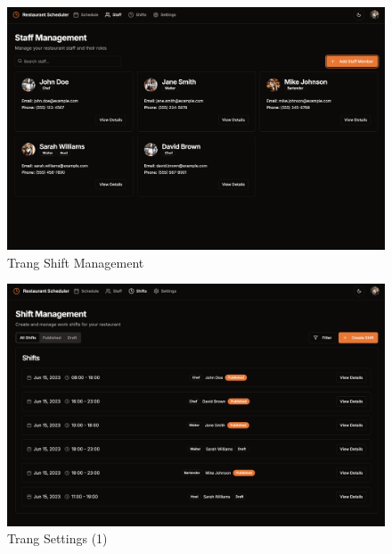 \begin{figure}[H]
	\centering
	\includegraphics[width=15cm]{Sections/tong_quan/functional_spec/img/proto1.7.png}

     \vspace{0.5cm}
    \caption{Trang Shift Management}
\end{figure}
\begin{figure}[H]
	\centering
	\includegraphics[width=15cm]{Sections/tong_quan/functional_spec/img/proto1.8.png}

     \vspace{0.5cm}
    \caption{Trang Settings (1)}
\end{figure}
